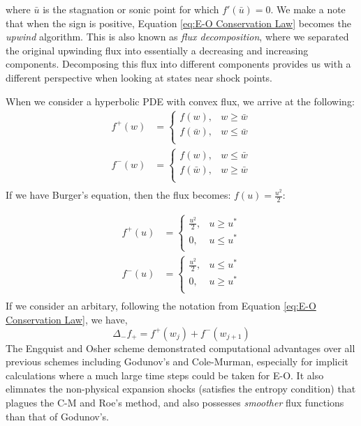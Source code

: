 \documentclass[a4paper]{article}
\begin{document}
where $\bar{u}$ is the stagnation or sonic point for which $f'(\bar{u}) = 0$. We make a note that when the sign is positive, Equation \ref{eq:E-O Conservation Law} becomes the \textit{upwind} algorithm. This is also known as \textit{flux decomposition}, where we separated the original upwinding flux into essentially a decreasing and increasing components. Decomposing this flux into different components provides us with a different perspective when looking at states near shock points.

When we consider a hyperbolic PDE with convex flux, we arrive at the following:
\begin{equation}
    \begin{split}
        f^+ (w) &= 
        \begin{cases}
            f(w), & w \geq \bar{w}\\
            f(\bar{w}), & w \leq \bar{w}\\
        \end{cases}\\
        f^-(w) &= 
        \begin{cases}
            f(w), & w \leq \bar{w} \\
            f(\bar{w}), & w \geq \bar{w}\\
        \end{cases}\\
    \end{split}
\end{equation}
If we have Burger's equation, then the flux becomes: $f(u) = \frac{u^2}{2}$:

\begin{equation}
    \begin{split}
        f^+ (u) &= 
        \begin{cases}
            \frac{u^2}{2}, & u \geq u^*\\
            0, & u \leq u^*\\
        \end{cases}\\
        f^-(u) &= 
        \begin{cases}
            \frac{u^2}{2}, & u \leq u^* \\
            0, & u \geq u^*\\
        \end{cases}\\
    \end{split}
\end{equation}
If we consider an arbitary, following the notation from Equation \ref{eq:E-O Conservation Law}, we have, 
\begin{equation}
    \Delta_- f_+ = f^+(w_j) + f^-({w_{j+1}})
\end{equation}
The Engquist and Osher scheme demonstrated computational advantages over all previous schemes including Godunov's and Cole-Murman, especially for implicit calculations where a much large time steps could be taken for E-O. It also elimnates the non-physical expansion shocks (satisfies the entropy condition) that plagues the C-M and Roe's method, and also possesses \textit{smoother} flux functions than that of Godunov's.
\end{document}
